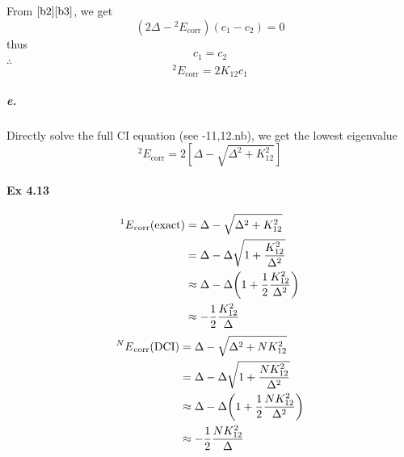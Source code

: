 \documentclass[a4paper]{article}
\DeclareMathOperator{\corr}{\mathrm{corr}}
\newcommand{\ex}[1]{\paragraph{Ex #1}}
\newcommand{\subex}[1]{\subparagraph{#1}}
\numberwithin{equation}{subsection}
\newcommand{\code}[1]{\colorbox{codegray}{{\Consolas#1}}}
\begin{document}
From $ \eqref{b2}\eqref{b3} $, we get
\begin{equation}\label{key}
(2\Delta - {^2 E}_{\corr})(c_1 - c_2) = 0
\end{equation}
thus
\begin{equation}\label{key}
c_1 = c_2
\end{equation}
$ \therefore $
\begin{equation}\label{key}
{^2 E}_{\corr} = 2 K_{12} c_1
\end{equation}
\fi
\subex{e.}
Directly solve the full CI equation (see \code{4-11,12.nb}), we get the lowest eigenvalue
\begin{equation}\label{key}
{^2 E}_{\corr} = 2[\Delta - \sqrt{\Delta^2 + K_{12}^2}]
\end{equation}

\ex{4.13}
\begin{align}
{^1 E}_{\corr}(\text{exact}) &= \Delta - \sqrt{\Delta^2 + K_{12}^2} \notag\\
&= \Delta - \Delta\sqrt{1 + \dfrac{K_{12}^2}{\Delta^2}} \notag\\
&\approx \Delta - \Delta\qty(1 + \dfrac{1}{2}\dfrac{K_{12}^2}{\Delta^2}) \notag\\
&\approx -\dfrac{1}{2}\dfrac{K_{12}^2}{\Delta}
\end{align}
\begin{align}
{^N E}_{\corr}(\text{DCI}) &= \Delta - \sqrt{\Delta^2 + N K_{12}^2} \notag\\
&= \Delta - \Delta\sqrt{1 + \dfrac{N K_{12}^2}{\Delta^2}} \notag\\
&\approx \Delta - \Delta\qty(1 + \dfrac{1}{2}\dfrac{N K_{12}^2}{\Delta^2}) \notag\\
&\approx -\dfrac{1}{2}\dfrac{N K_{12}^2}{\Delta}
\end{align}
\end{document}
